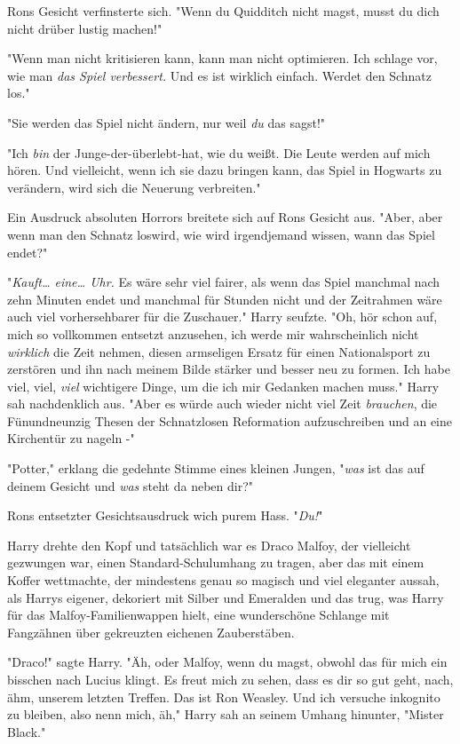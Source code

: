 {Rons Gesicht verfinsterte sich. "Wenn du Quidditch nicht magst, musst du dich nicht drüber lustig machen!"

"Wenn man nicht kritisieren kann, kann man nicht optimieren. Ich schlage vor, wie man \emph{das Spiel verbessert.} Und es ist wirklich einfach. Werdet den Schnatz los."

"Sie werden das Spiel nicht ändern, nur weil \emph{du} das sagst!"

"Ich \emph{bin} der Junge-der-überlebt-hat, wie du weißt. Die Leute werden auf mich hören. Und vielleicht, wenn ich sie dazu bringen kann, das Spiel in Hogwarts zu verändern, wird sich die Neuerung verbreiten."

Ein Ausdruck absoluten Horrors breitete sich auf Rons Gesicht aus. "Aber, aber wenn man den Schnatz loswird, wie wird irgendjemand wissen, wann das Spiel endet?"

"\emph{Kauft… eine… Uhr.} Es wäre sehr viel fairer, als wenn das Spiel manchmal nach zehn Minuten endet und manchmal für Stunden nicht und der Zeitrahmen wäre auch viel vorhersehbarer für die Zuschauer." Harry seufzte. "Oh, hör schon auf, mich so vollkommen entsetzt anzusehen, ich werde mir wahrscheinlich nicht \emph{wirklich} die Zeit nehmen, diesen armseligen Ersatz für einen Nationalsport zu zerstören und ihn nach meinem Bilde stärker und besser neu zu formen. Ich habe viel, viel, \emph{viel} wichtigere Dinge, um die ich mir Gedanken machen muss." Harry sah nachdenklich aus. "Aber es würde auch wieder nicht viel Zeit \emph{brauchen}, die Fünundneunzig Thesen der Schnatzlosen Reformation aufzuschreiben und an eine Kirchentür zu nageln -"

"Potter," erklang die gedehnte Stimme eines kleinen Jungen, "\emph{was} ist das auf deinem Gesicht und \emph{was} steht da neben dir?"

Rons entsetzter Gesichtsausdruck wich purem Hass. "\emph{Du!}"

Harry drehte den Kopf und tatsächlich war es Draco Malfoy, der vielleicht gezwungen war, einen Standard-Schulumhang zu tragen, aber das mit einem Koffer wettmachte, der mindestens genau so magisch und viel eleganter aussah, als Harrys eigener, dekoriert mit Silber und Emeralden und das trug, was Harry für das Malfoy-Familienwappen hielt, eine wunderschöne Schlange mit Fangzähnen über gekreuzten eichenen Zauberstäben.

"Draco!" sagte Harry. "Äh, oder Malfoy, wenn du magst, obwohl das für mich ein bisschen nach Lucius klingt. Es freut mich zu sehen, dass es dir so gut geht, nach, ähm, unserem letzten Treffen. Das ist Ron Weasley. Und ich versuche inkognito zu bleiben, also nenn mich, äh," Harry sah an seinem Umhang hinunter, "Mister Black."

}
